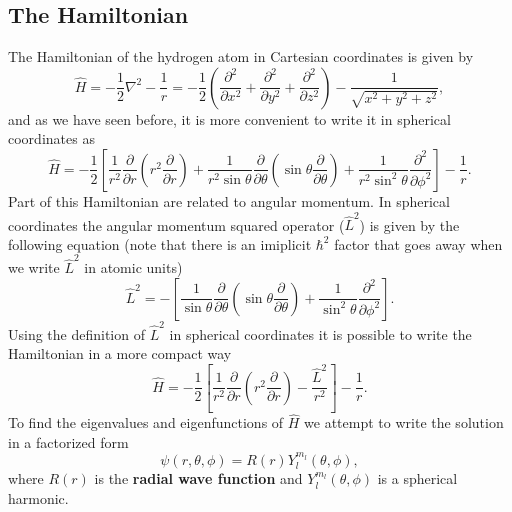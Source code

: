 \documentclass[../Main/chem331-notes.tex]{subfiles}
\begin{document}
\subsection{The Hamiltonian}
The Hamiltonian of the hydrogen atom in Cartesian coordinates is given by
\begin{equation}
\hat{H} = -\frac{1}{2} \nabla^2 - \frac{1}{r} = -\frac{1}{2} \left(\frac{\partial^2}{\partial x^2} + \frac{\partial^2}{\partial y^2} + \frac{\partial^2}{\partial z^2} \right) - \frac{1}{\sqrt{x^2 + y^2 + z^2}},
\end{equation}
and as we have seen before, it is more convenient to write it in spherical coordinates as
\begin{equation}
\hat{H} =  -\frac{1}{2} \left[ \frac{1}{r^2} \frac{\partial}{\partial r} \left( r^2 \frac{\partial }{\partial r} \right)
+ \frac{1}{r^2 \sin \theta} \frac{\partial}{\partial \theta} \left( \sin\theta \frac{\partial }{\partial \theta} \right)
+ \frac{1}{r^2 \sin^2 \theta} \frac{\partial^2}{\partial \phi^2} \right]  - \frac{1}{r}.
\end{equation}
Part of this Hamiltonian are related to angular momentum.
In spherical coordinates the angular momentum squared operator ($\hat{L}^2$) is given by the following equation (note that there is an imiplicit $\hbar^2$ factor that  goes away when we write $\hat{L}^2$ in atomic units)
\begin{equation}
\hat{L}^2 = - \left[\frac{1}{ \sin \theta} \frac{\partial}{\partial \theta} \left( \sin\theta \frac{\partial }{\partial \theta} \right)
+ \frac{1}{ \sin^2 \theta} \frac{\partial^2}{\partial \phi^2} \right].
\end{equation}
Using the definition of $\hat{L}^2$ in spherical coordinates it is possible to write the Hamiltonian in a more compact way
\begin{equation}
\hat{H} =  -\frac{1}{2} \left[ \frac{1}{r^2} \frac{\partial}{\partial r} \left( r^2 \frac{\partial }{\partial r} \right)
- \frac{\hat{L}^2}{r^2}  \right]  - \frac{1}{r}.
\end{equation}
To find the eigenvalues and eigenfunctions of $\hat{H}$ we attempt to write the solution in a factorized form
\begin{equation}
\psi(r,\theta,\phi) = R(r) Y_l^{m_l}(\theta,\phi),
\end{equation}
where $R(r)$ is the \textbf{radial wave function} and $Y_l^{m_l}(\theta,\phi)$ is a spherical harmonic.
\end{document}
